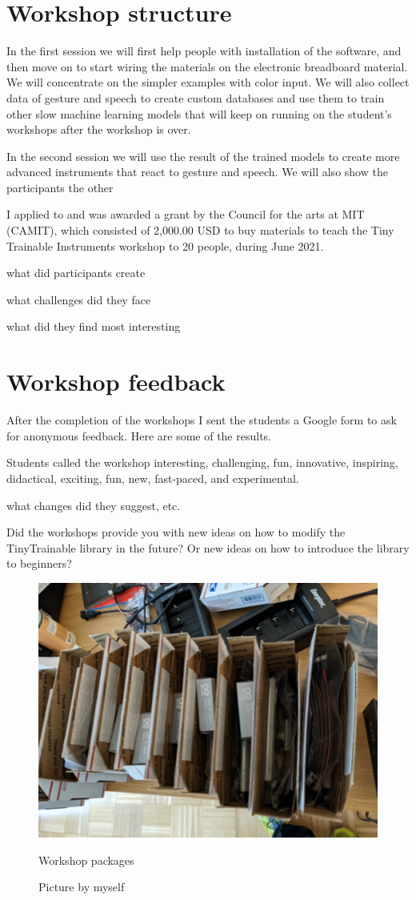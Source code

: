 \section{Workshop structure}

In the first session we will first help people with installation of the software, and then move on to start wiring the materials on the electronic breadboard material. We will concentrate on the simpler examples with color input. We will also collect data of gesture and speech to create custom databases and use them to train other slow machine learning models that will keep on running on the student's workshops after the workshop is over.

In the second session we will use the result of the trained models to create more advanced instruments that react to gesture and speech. We will also show the participants the other 

I applied to and was awarded a grant by the Council for the arts at MIT (CAMIT), which consisted of 2,000.00 USD to buy materials to teach the Tiny Trainable Instruments workshop to 20 people, during June 2021.


what did participants create

what challenges did they face

what did they find most interesting

\section{Workshop feedback}

After the completion of the workshops I sent the students a Google form to ask for anonymous feedback. Here are some of the results.

Students called the workshop interesting, challenging, fun, innovative, inspiring, didactical, exciting, fun, new, fast-paced, and experimental.


what changes did they suggest, etc.

Did the workshops provide you with new ideas on how to modify the TinyTrainable library in the future? Or new ideas on how to introduce the library to beginners?

\begin{figure}[ht]
  \centering
  \includegraphics[width=0.75\linewidth,height=0.25\textheight,keepaspectratio]{images/workshop-packages.jpg}
  \caption{Workshop packages}
  \caption*{Picture by myself}
  \label{fig:workshop-packages}
\end{figure}

